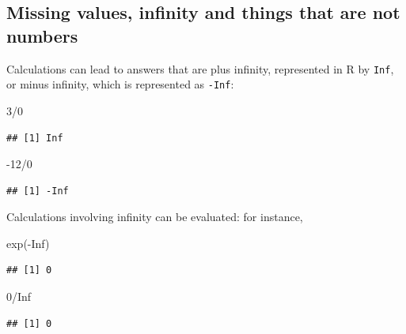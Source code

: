 \documentclass[
]{book}
\newenvironment{Shaded}{\begin{snugshade}}{\end{snugshade}}
\newcommand{\ConstantTok}[1]{\textcolor[rgb]{0.00,0.00,0.00}{#1}}
\newcommand{\DecValTok}[1]{\textcolor[rgb]{0.00,0.00,0.81}{#1}}
\newcommand{\FunctionTok}[1]{\textcolor[rgb]{0.00,0.00,0.00}{#1}}
\newcommand{\NormalTok}[1]{#1}
\newcommand{\SpecialCharTok}[1]{\textcolor[rgb]{0.00,0.00,0.00}{#1}}
\theoremstyle{definition}
\theoremstyle{definition}
\theoremstyle{definition}
\theoremstyle{definition}
\theoremstyle{remark}
\begin{document}
\hypertarget{missing-values-infinity-and-things-that-are-not-numbers}{%
\subsection{Missing values, infinity and things that are not numbers}\label{missing-values-infinity-and-things-that-are-not-numbers}}

Calculations can lead to answers that are plus infinity, represented in R by \texttt{Inf}, or minus infinity, which is represented as \texttt{-Inf}:

\begin{Shaded}
\begin{Highlighting}[]
\DecValTok{3}\SpecialCharTok{/}\DecValTok{0}
\end{Highlighting}
\end{Shaded}

\begin{verbatim}
## [1] Inf
\end{verbatim}

\begin{Shaded}
\begin{Highlighting}[]
\SpecialCharTok{{-}}\DecValTok{12}\SpecialCharTok{/}\DecValTok{0}
\end{Highlighting}
\end{Shaded}

\begin{verbatim}
## [1] -Inf
\end{verbatim}

Calculations involving infinity can be evaluated: for instance,

\begin{Shaded}
\begin{Highlighting}[]
\FunctionTok{exp}\NormalTok{(}\SpecialCharTok{{-}}\ConstantTok{Inf}\NormalTok{)}
\end{Highlighting}
\end{Shaded}

\begin{verbatim}
## [1] 0
\end{verbatim}

\begin{Shaded}
\begin{Highlighting}[]
\DecValTok{0}\SpecialCharTok{/}\ConstantTok{Inf}
\end{Highlighting}
\end{Shaded}

\begin{verbatim}
## [1] 0
\end{verbatim}
\end{document}
